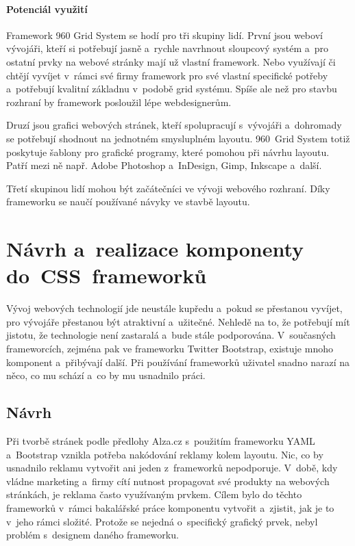 \documentclass[thesis=B,czech]{FITthesis}[2012/06/26]
\begin{document}
\paragraph{Potenciál využití}

Framework 960 Grid System se hodí pro tři skupiny lidí. První jsou weboví vývojáři, kteří si potřebují jasně a~rychle navrhnout sloupcový systém a~pro ostatní prvky na webové stránky mají už vlastní framework. Nebo využívají či chtějí vyvíjet v~rámci své firmy framework pro své vlastní specifické potřeby a~potřebují kvalitní základnu v~podobě grid systému. Spíše ale než pro stavbu rozhraní by framework posloužil lépe webdesignerům. 

Druzí jsou grafici webových stránek, kteří spolupracují s~vývojáři a~dohromady se potřebují shodnout na jednotném smysluplném layoutu. 960~Grid System totiž poskytuje šablony pro grafické programy, které pomohou při návrhu layoutu. Patří mezi ně např. Adobe Photoshop a~InDesign, Gimp, Inkscape a~další. 

Třetí skupinou lidí mohou být začátečníci ve vývoji webového rozhraní. Díky frameworku se naučí používané návyky ve stavbě layoutu.


\section{Návrh a~realizace komponenty do~CSS~frameworků}


Vývoj webových technologií jde neustále kupředu a~pokud se přestanou vyvíjet, pro vývojáře přestanou být atraktivní a~užitečné. Nehledě na to, že potřebují mít jistotu, že technologie není zastaralá a~bude stále podporována. V~současných frameworcích, zejména pak ve frameworku Twitter Bootstrap, existuje mnoho komponent a~přibývají další. Při používání frameworků uživatel snadno narazí na něco, co mu schází a~co by mu usnadnilo práci.

\subsection{Návrh}

Při tvorbě stránek podle předlohy Alza.cz s~použitím frameworku \gls{YAML} a~Bootstrap vznikla potřeba nakódování reklamy kolem layoutu. Nic, co by usnadnilo reklamu vytvořit ani jeden z~frameworků nepodporuje. V~době, kdy vládne marketing a~firmy cítí nutnost propagovat své produkty na webových stránkách, je reklama často využívaným prvkem. Cílem bylo do těchto frameworků v~rámci bakalářské práce komponentu vytvořit a~zjistit, jak je to v~jeho rámci složité. Protože se nejedná o~specifický grafický prvek, nebyl problém s~designem daného frameworku.
\end{document}
